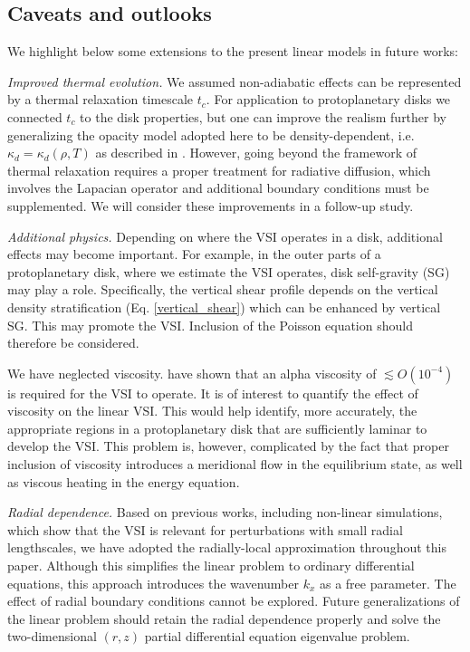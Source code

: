 
\subsection{Caveats and outlooks} 
We highlight below some extensions to the present  
linear models in future works:  

\emph{Improved thermal evolution.} We assumed non-adiabatic effects
can be represented by a thermal relaxation timescale $t_c$. For 
application to protoplanetary disks we connected $t_c$ to the disk
properties, but one can improve the realism further by generalizing the
opacity model adopted here to be density-dependent,  i.e. $\kappa_d =
\kappa_d(\rho, T)$ as described in \cite{bell94}. %
However, going beyond the framework of thermal
relaxation requires a proper treatment for radiative diffusion, which
involves the Lapacian operator and additional boundary conditions
must be supplemented. We will consider these improvements in a
follow-up study. 
 
\emph{Additional physics.} Depending on where the VSI operates in a
disk, additional effects may become important. For example, in the
outer parts of a protoplanetary disk, where we estimate the VSI 
operates, disk self-gravity (SG) may play a role. Specifically, the vertical
shear profile depends on the vertical density stratification
(Eq. \ref{vertical_shear}) which can be enhanced by vertical SG. This
may promote the VSI. Inclusion of the Poisson equation should
therefore be considered.  

We have neglected viscosity. \cite{nelson13} have shown that an
alpha viscosity of $\lesssim O(10^{-4})$ is required for the VSI to
operate. It is of interest to quantify the effect of viscosity
on the linear VSI. This would help identify, more accurately, the
appropriate regions in a protoplanetary disk that are sufficiently
laminar to develop the VSI.  This problem is, however, complicated by
the fact that proper inclusion of viscosity introduces a meridional
flow in the equilibrium state, as well as viscous heating
in the energy equation. 


\emph{Radial dependence.} Based on previous works, including
non-linear simulations, which show that the VSI is relevant for
perturbations with small radial lengthscales, we have adopted the
radially-local approximation throughout this paper.  Although this
simplifies the linear problem to ordinary differential equations, this
approach introduces the wavenumber $k_x$ as a free parameter. The
effect of radial boundary conditions cannot be explored. Future 
generalizations of the linear problem should retain the radial
dependence properly and solve the two-dimensional $(r,z)$ partial 
differential equation eigenvalue problem. 

